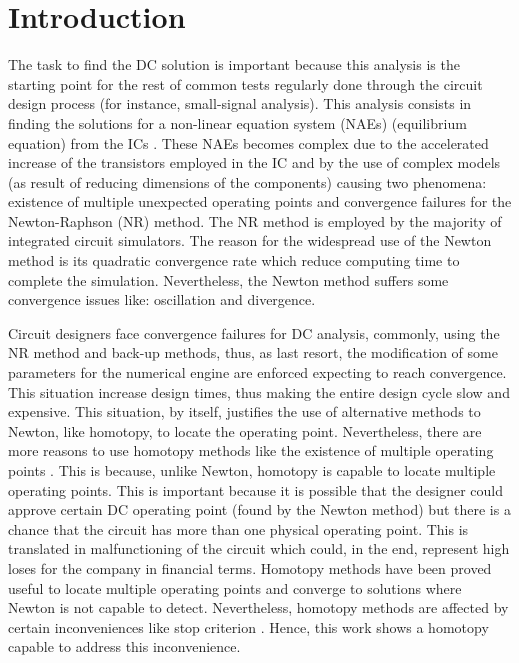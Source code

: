 \documentclass{elex}
\begin{document}
\section{Introduction}

The task to find the DC solution is important because this analysis is the starting point for the rest of common tests regularly done through the circuit design process (for instance, small-signal analysis). This analysis consists in finding the solutions for a non-linear equation system (NAEs) (equilibrium equation) from the ICs \cite{Schwa_book}. These NAEs becomes complex due to the accelerated increase of the transistors employed in the IC and by the use of complex models (as result of reducing dimensions of the components) causing two phenomena: existence of multiple unexpected operating points and convergence failures for the Newton-Raphson (NR) method. The NR method is employed by the majority of integrated circuit simulators. The reason for the widespread use of the Newton method is its quadratic convergence rate which reduce computing time to complete the simulation. Nevertheless, the Newton method \cite{NEWTONR} suffers some convergence issues like: oscillation and divergence.

Circuit designers face convergence failures for DC analysis, commonly, using the NR method and back-up methods, thus, as last resort, the modification of some parameters for the numerical engine are enforced expecting to reach convergence. This situation increase design times, thus making the entire design cycle slow and expensive. This situation, by itself, justifies the use of alternative methods to Newton, like homotopy, to locate the operating point. Nevertheless, there are more reasons to use homotopy methods like the existence of multiple operating points \cite{green}. This is because, unlike Newton, homotopy is capable to locate multiple operating points. This is important because it is possible that the designer could approve certain DC operating point (found by the Newton method) but there is a chance that the circuit has more than one physical operating point. This is translated in malfunctioning of the circuit which could, in the end, represent high loses for the company in financial terms. Homotopy methods \cite{homo_green2,homo_ArtificialP,BHLHOM,homo_DWolfMulti} have been proved useful to locate multiple operating points and converge to solutions where Newton is not capable to detect. Nevertheless, homotopy methods are affected by certain inconveniences like stop criterion \cite{homo_iscas05,homo_hk05}. Hence, this work shows a homotopy capable to address this inconvenience.
\end{document}
